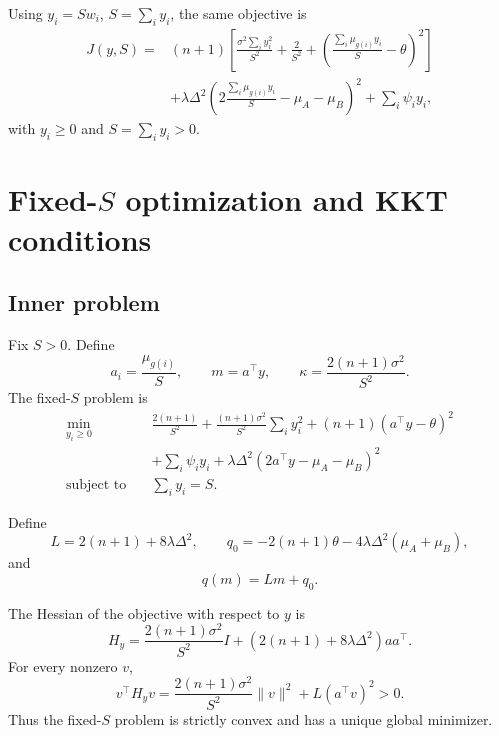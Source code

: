 \documentclass[11pt,a4paper]{article}
\newcommand{\1}{\mathbf{1}}
\begin{document}
Using \(y_i=Sw_i\), \(S=\sum_i y_i\), the same objective is
\begin{equation}
  \begin{aligned}
  J(y,S)
  ={}&(n+1)\left[
      \frac{\sigma^2\sum_i y_i^2}{S^2}
      +\frac{2}{S^2}
      +\left(\frac{\sum_i\mu_{g(i)}y_i}{S}-\theta\right)^2
      \right]\\
    &+\lambda\Delta^2
      \left(
      2\frac{\sum_i\mu_{g(i)}y_i}{S}
      -\mu_A-\mu_B
      \right)^2
      +\sum_i\psi_i y_i,
  \end{aligned}
  \label{eq:full-y-objective}
\end{equation}
with \(y_i\geq0\) and \(S=\sum_i y_i>0\).

\section{Fixed-\texorpdfstring{$S$}{S} optimization and KKT conditions}

\subsection{Inner problem}

Fix \(S>0\). Define
\begin{equation}
  a_i=\frac{\mu_{g(i)}}{S},
  \qquad
  m=a^\top y,
  \qquad
  \kappa=\frac{2(n+1)\sigma^2}{S^2}.
\end{equation}
The fixed-\(S\) problem is
\begin{equation}
  \begin{aligned}
  \min_{y_i\geq0}\quad&
  \frac{2(n+1)}{S^2}
  +\frac{(n+1)\sigma^2}{S^2}\sum_i y_i^2
  +(n+1)(a^\top y-\theta)^2\\
  &+\sum_i\psi_i y_i
  +\lambda\Delta^2
      (2a^\top y-\mu_A-\mu_B)^2\\
  \text{subject to}\quad&\sum_i y_i=S.
  \end{aligned}
  \label{eq:fixed-S}
\end{equation}

Define
\begin{equation}
  L=2(n+1)+8\lambda\Delta^2,
  \qquad
  q_0=-2(n+1)\theta-4\lambda\Delta^2(\mu_A+\mu_B),
  \label{eq:Lq0}
\end{equation}
and
\begin{equation}
  q(m)=Lm+q_0.
  \label{eq:q}
\end{equation}

The Hessian of the objective with respect to \(y\) is
\begin{equation}
  H_y
  =
  \frac{2(n+1)\sigma^2}{S^2}I
  +\left(2(n+1)+8\lambda\Delta^2\right)aa^\top.
  \label{eq:hessian}
\end{equation}
For every nonzero \(v\),
\begin{equation}
  v^\top H_yv
  =
  \frac{2(n+1)\sigma^2}{S^2}\|v\|^2
  +L(a^\top v)^2>0.
\end{equation}
Thus the fixed-\(S\) problem is strictly convex and has a unique global
minimizer.
\end{document}
